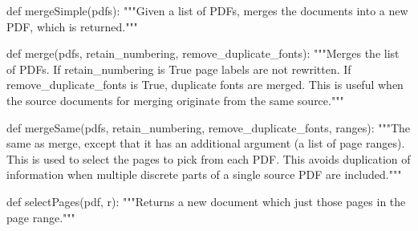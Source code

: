def mergeSimple(pdfs):
    """Given a list of PDFs, merges the documents into a new PDF, which is
    returned."""

def merge(pdfs, retain_numbering, remove_duplicate_fonts):
    """Merges the list of PDFs. If retain_numbering is True page labels are not
    rewritten. If remove_duplicate_fonts is True, duplicate fonts are merged.
    This is useful when the source documents for merging originate from the
    same source."""

def mergeSame(pdfs, retain_numbering, remove_duplicate_fonts, ranges):
    """The same as merge, except that it has an additional argument (a list of
    page ranges). This is used to select the pages to pick from each PDF. This
    avoids duplication of information when multiple discrete parts of a single
    source PDF are included."""

def selectPages(pdf, r):
    """Returns a new document which just those pages in the page range."""
